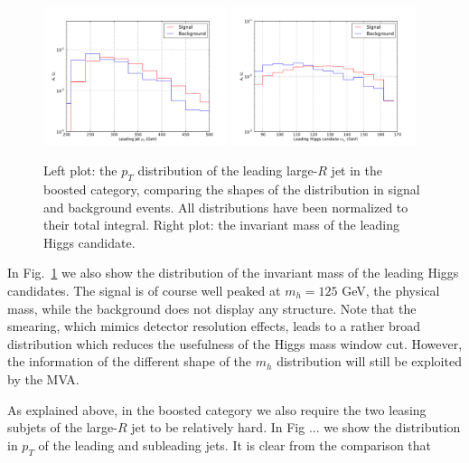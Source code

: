 \begin{figure}[t]
\begin{center}
  \includegraphics[width=0.48\textwidth]{plots/pt_H0_res_C1_boost.pdf}
  \includegraphics[width=0.48\textwidth]{plots/m_H0_res_C1_boost.pdf}
\caption{\small Left plot: the $p_T$ distribution of the
  leading large-$R$ jet in the boosted category, comparing
  the shapes of the distribution in signal and background events.
  All distributions have been normalized to their total integral.
  Right plot: the invariant mass of the leading Higgs
  candidate.
}
\label{fig:cutplots1}
\end{center}
\end{figure}

In Fig.~\ref{fig:cutplots1} we also show the distribution
of the invariant mass of the leading Higgs candidates.
%
The signal is of course well peaked at $m_h=125$ GeV, the physical
mass, while the background does not display any structure.
%
Note that the smearing, which mimics detector resolution effects,
leads to a rather broad distribution which reduces the usefulness
of the Higgs mass window cut.
%
However, the information of the different shape of the $m_{h}$
distribution will still be exploited by the MVA.

As explained above, in the boosted category we also require the two
leasing subjets of the large-$R$ jet to be relatively
hard.
%
In Fig ... we show the distribution in $p_T$ of the leading
and subleading jets.
%
It is clear from the comparison that




